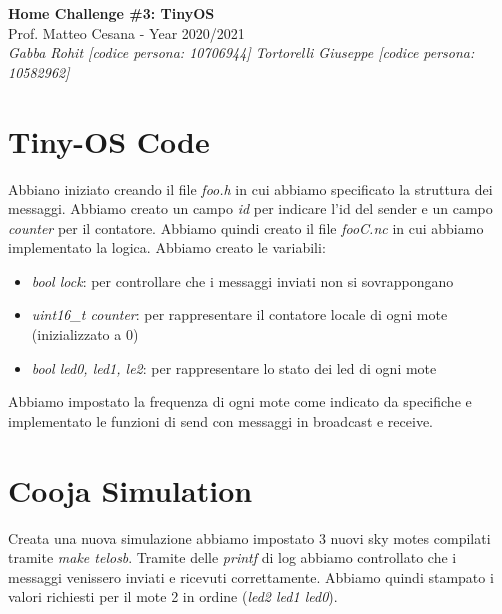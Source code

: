 \documentclass{article}
\begin{document}
\begin{titlepage}
   \begin{center}
      \Huge\textbf{Home Challenge \#3: TinyOS}\\
      \vspace{5mm} %
      \Large Prof. Matteo Cesana - Year 2020/2021\\
      \vspace{5mm} %
      \large\textit{Gabba Rohit [codice persona: 10706944]}
      \linebreak
      \large\textit{Tortorelli Giuseppe [codice persona: 10582962]}
      \linebreak
      \linebreak
      \linebreak
      \linebreak
   \end{center}
\end{titlepage}

\pagebreak

\section{Tiny-OS Code}
Abbiano iniziato creando il file \textit{foo.h} in cui abbiamo specificato la struttura dei messaggi.
Abbiamo creato un campo \textit{id} per indicare l'id del sender e un campo \textit{counter} per il contatore.
Abbiamo quindi creato il file \textit{fooC.nc} in cui abbiamo implementato la logica.
Abbiamo creato le variabili:
\begin{itemize}
   \item \textit{bool lock}: per controllare che i messaggi inviati non si sovrappongano
   \item \textit{uint16\_t counter}: per rappresentare il contatore locale di ogni mote (inizializzato a 0)
   \item \textit{bool led0, led1, le2}: per rappresentare lo stato dei led di ogni mote
\end{itemize}
Abbiamo impostato la frequenza di ogni mote come indicato da specifiche e implementato le funzioni di send con messaggi in broadcast e receive.


\section{Cooja Simulation}
Creata una nuova simulazione abbiamo impostato 3 nuovi sky motes compilati tramite \textit{make telosb}.
Tramite delle \textit{printf} di log abbiamo controllato che i messaggi venissero inviati e ricevuti correttamente.
Abbiamo quindi stampato i valori richiesti per il mote 2 in ordine (\textit{led2 led1 led0}).
\end{document}
